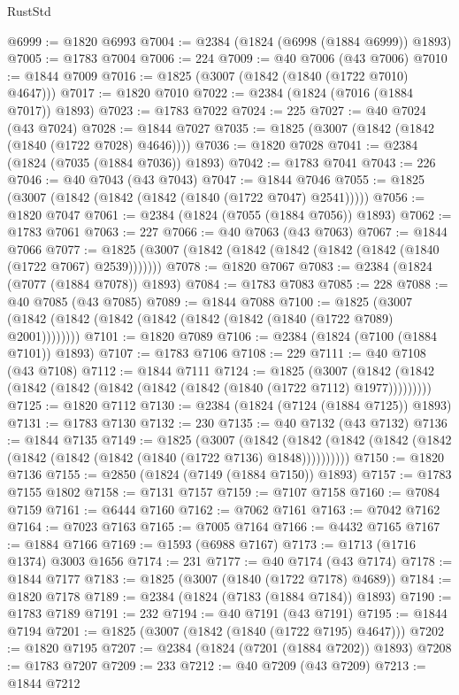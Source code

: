 \begin{lexlean}{RustStd}
\begin{coremodule}
{\begin{coremodule}
{{{{{{{{{{{{{{{{{{{{{{{{{{{{{{{{{{{{{{{{{{{{{{{@6999 := @1820 @6993
@7004 := @2384 (@1824 (@6998 (@1884 @6999)) @1893)
@7005 := @1783 @7004
@7006 := 224
@7009 := @40 @7006 (@43 @7006)
@7010 := @1844 @7009
@7016 := @1825 (@3007 (@1842 (@1840 (@1722 @7010) @4647)))
@7017 := @1820 @7010
@7022 := @2384 (@1824 (@7016 (@1884 @7017)) @1893)
@7023 := @1783 @7022
@7024 := 225
@7027 := @40 @7024 (@43 @7024)
@7028 := @1844 @7027
@7035 := @1825 (@3007 (@1842 (@1842 (@1840 (@1722 @7028) @4646))))
@7036 := @1820 @7028
@7041 := @2384 (@1824 (@7035 (@1884 @7036)) @1893)
@7042 := @1783 @7041
@7043 := 226
@7046 := @40 @7043 (@43 @7043)
@7047 := @1844 @7046
@7055 := @1825 (@3007 (@1842 (@1842 (@1842 (@1840 (@1722 @7047) @2541)))))
@7056 := @1820 @7047
@7061 := @2384 (@1824 (@7055 (@1884 @7056)) @1893)
@7062 := @1783 @7061
@7063 := 227
@7066 := @40 @7063 (@43 @7063)
@7067 := @1844 @7066
@7077 := @1825 (@3007 (@1842 (@1842 (@1842 (@1842 (@1842 (@1840 (@1722 @7067) @2539)))))))
@7078 := @1820 @7067
@7083 := @2384 (@1824 (@7077 (@1884 @7078)) @1893)
@7084 := @1783 @7083
@7085 := 228
@7088 := @40 @7085 (@43 @7085)
@7089 := @1844 @7088
@7100 := @1825 (@3007 (@1842 (@1842 (@1842 (@1842 (@1842 (@1842 (@1840 (@1722 @7089) @2001))))))))
@7101 := @1820 @7089
@7106 := @2384 (@1824 (@7100 (@1884 @7101)) @1893)
@7107 := @1783 @7106
@7108 := 229
@7111 := @40 @7108 (@43 @7108)
@7112 := @1844 @7111
@7124 := @1825
    (@3007 (@1842 (@1842 (@1842 (@1842 (@1842 (@1842 (@1842 (@1840 (@1722 @7112) @1977)))))))))
@7125 := @1820 @7112
@7130 := @2384 (@1824 (@7124 (@1884 @7125)) @1893)
@7131 := @1783 @7130
@7132 := 230
@7135 := @40 @7132 (@43 @7132)
@7136 := @1844 @7135
@7149 := @1825
    (@3007
      (@1842 (@1842 (@1842 (@1842 (@1842 (@1842 (@1842 (@1842 (@1840 (@1722 @7136) @1848))))))))))
@7150 := @1820 @7136
@7155 := @2850 (@1824 (@7149 (@1884 @7150)) @1893)
@7157 := @1783 @7155 @1802
@7158 := @7131 @7157
@7159 := @7107 @7158
@7160 := @7084 @7159
@7161 := @6444 @7160
@7162 := @7062 @7161
@7163 := @7042 @7162
@7164 := @7023 @7163
@7165 := @7005 @7164
@7166 := @4432 @7165
@7167 := @1884 @7166
@7169 := @1593 (@6988 @7167)
@7173 := @1713 (@1716 @1374) @3003 @1656
@7174 := 231
@7177 := @40 @7174 (@43 @7174)
@7178 := @1844 @7177
@7183 := @1825 (@3007 (@1840 (@1722 @7178) @4689))
@7184 := @1820 @7178
@7189 := @2384 (@1824 (@7183 (@1884 @7184)) @1893)
@7190 := @1783 @7189
@7191 := 232
@7194 := @40 @7191 (@43 @7191)
@7195 := @1844 @7194
@7201 := @1825 (@3007 (@1842 (@1840 (@1722 @7195) @4647)))
@7202 := @1820 @7195
@7207 := @2384 (@1824 (@7201 (@1884 @7202)) @1893)
@7208 := @1783 @7207
@7209 := 233
@7212 := @40 @7209 (@43 @7209)
@7213 := @1844 @7212
}}}}}}}}}}}}}}}}}}}}}}}}}}}}}}}}}}}}}}}}}}}}}}}
\end{coremodule}}
\end{coremodule}
\end{lexlean}
